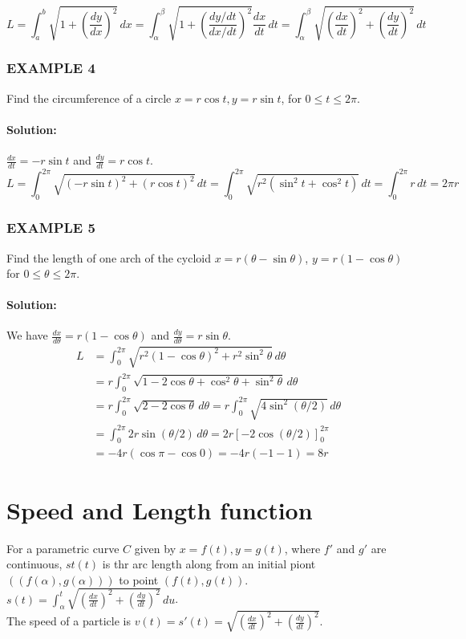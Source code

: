 \documentclass{article}
\begin{document}
\[
L = \int_{a}^{b} \sqrt{1 + \left(\frac{dy}{dx}\right)^2} \, dx =\int_{\alpha}^{\beta}\sqrt{1+\left(\frac{dy/dt}{dx/dt}\right)^2} \frac{dx}{dt}\, dt= \int _{\alpha}^{\beta}\sqrt{\left(\frac{dx}{dt}\right)^2 + \left(\frac{dy}{dt}\right)^2} \, dt
\]

\subsubsection*{EXAMPLE 4}
Find the circumference of a circle $x=r\cos t, y=r\sin t$, for $0 \le t \le 2\pi$.

\paragraph{Solution:}
$\frac{dx}{dt} = -r\sin t$ and $\frac{dy}{dt} = r\cos t$.
\[
L = \int_{0}^{2\pi} \sqrt{(-r\sin t)^2 + (r\cos t)^2} \, dt = \int_{0}^{2\pi} \sqrt{r^2(\sin^2 t + \cos^2 t)} \, dt = \int_{0}^{2\pi} r \, dt = 2\pi r
\]

\subsubsection*{EXAMPLE 5}
Find the length of one arch of the cycloid $x = r(\theta-\sin\theta)$, $y = r(1-\cos\theta)$ for $0 \le \theta \le 2\pi$.

\paragraph{Solution:}
We have $\frac{dx}{d\theta} = r(1-\cos\theta)$ and $\frac{dy}{d\theta} = r\sin\theta$.
\begin{align*}
    L &= \int_{0}^{2\pi} \sqrt{r^2(1-\cos\theta)^2 + r^2\sin^2\theta} \, d\theta \\
    &= r \int_{0}^{2\pi} \sqrt{1 - 2\cos\theta + \cos^2\theta + \sin^2\theta} \, d\theta \\
    &= r \int_{0}^{2\pi} \sqrt{2 - 2\cos\theta} \, d\theta = r \int_{0}^{2\pi} \sqrt{4\sin^2(\theta/2)} \, d\theta \\
    &= \int_{0}^{2\pi} 2r\sin(\theta/2) \, d\theta = 2r \left[ -2\cos(\theta/2) \right]_{0}^{2\pi} \\
    &= -4r(\cos\pi - \cos 0) = -4r(-1 - 1) = 8r
\end{align*}

\section*{Speed and Length function}
For a parametric curve $C$ given by $x=f(t), y=g(t)$, where $f'$ and $g'$ are continuous, $st(t)$ is thr arc length along from an initial piont $((f(\alpha), g(\alpha)))$ to point $(f(t), g(t))$.
\\$s(t) = \int_{\alpha}^{t}\sqrt{(\frac{dx}{dt})^2 + (\frac{dy}{dt})^2} \, du$.
\\The speed of a particle is $v(t) = s'(t) = \sqrt{(\frac{dx}{dt})^2 + (\frac{dy}{dt})^2}$.
\end{document}
